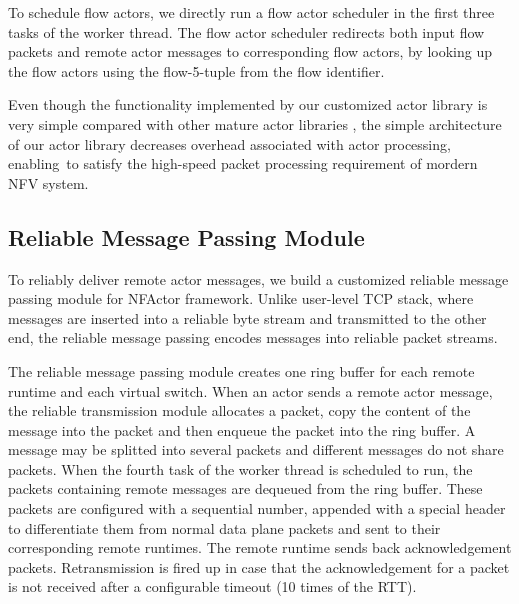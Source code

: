 To schedule flow actors, we directly run a flow actor scheduler in the first three tasks of the worker thread. The flow actor scheduler redirects both input flow packets and remote actor messages to corresponding flow actors, by looking up the flow actors using the flow-5-tuple from the flow identifier.

Even though the functionality implemented by our customized actor library is very simple compared with other mature actor libraries \cite{akka} \cite{caf}, the simple architecture of our actor library decreases overhead associated with actor processing, enabling~\nfactor to satisfy the high-speed packet processing requirement of mordern NFV system. %

\subsection{Reliable Message Passing Module}
\label{sec:ReliableMsgPassing}

To reliably deliver remote actor messages, we build a customized reliable message passing module for NFActor framework. Unlike user-level TCP stack, where messages are inserted into a reliable byte stream and transmitted to the other end, the reliable message passing encodes messages into reliable packet streams.

The reliable message passing module creates one ring buffer for each remote runtime and each virtual switch. When an actor sends a remote actor message, the reliable transmission module allocates a packet, copy the content of the message into the packet and then enqueue the packet into the ring buffer. A message may be splitted into several packets and different messages do not share packets. When the fourth task of the worker thread is scheduled to run, the packets containing remote messages are dequeued from the ring buffer. These packets are configured with a sequential number, appended with a special header to differentiate them from normal data plane packets and sent to their corresponding remote runtimes. The remote runtime sends back acknowledgement packets. Retransmission is fired up in case that the acknowledgement for a packet is not received after a configurable timeout (10 times of the RTT).

